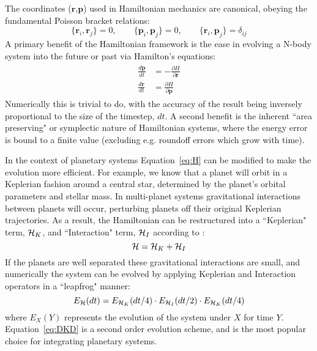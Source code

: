 The coordinates ($\textbf{r}$,$\textbf{p}$) used in Hamiltonian mechanics are canonical, obeying the fundamental Poisson bracket relations:
\begin{equation}
\{\textbf{r}_i, \textbf{r}_j\} = 0, \qquad
\{\textbf{p}_i, \textbf{p}_j\} = 0, \qquad
\{\textbf{r}_i, \textbf{p}_j\} = \delta_{ij}
\end{equation}
A primary benefit of the Hamiltonian framework is the ease in evolving a N-body system into the future or past via Hamilton's equations:
\begin{align}
\begin{split}
\frac{d\textbf{p}}{dt} &= -\frac{\partial H}{\partial \textbf{r}} \\
\frac{d\textbf{r}}{dt} &= \frac{\partial H}{\partial \textbf{p}} 
\label{eq:Heq}
\end{split}
\end{align}
Numerically this is trivial to do, with the accuracy of the result being inversely proportional to the size of the timestep, $dt$.
A second benefit is the inherent ``area preserving" or symplectic nature of Hamiltonian systems, where the energy error is bound to a finite value (excluding e.g. roundoff errors which grow with time).

In the context of planetary systems Equation~\ref{eq:H} can be modified to make the evolution more efficient.
For example, we know that a planet will orbit in a Keplerian fashion around a central star, determined by the planet's orbital parameters and stellar mass. 
In multi-planet systems gravitational interactions between planets will occur, perturbing planets off their original Keplerian trajectories.
As a result, the Hamiltonian can be restructured into a ``Keplerian" term, $\mathcal{H}_K$, and ``Interaction" term, $\mathcal{H}_I$ according to \citep{Wisdom1991}:
\begin{equation*}
\mathcal{H} = \mathcal{H}_K + \mathcal{H}_I
\end{equation*}
If the planets are well separated these gravitational interactions are small, and numerically the system can be evolved by applying Keplerian and Interaction operators in a ``leapfrog" manner:
\begin{equation}
E_{\mathcal{H}}(dt) = E_{\mathcal{H}_K}(dt/4) \cdot E_{\mathcal{H}_I}(dt/2) \cdot E_{\mathcal{H}_K}(dt/4)
\label{eq:DKD}
\end{equation}
where $E_{X}(Y)$ represents the evolution of the system under $X$ for time $Y$.
Equation~\ref{eq:DKD} is a second order evolution scheme, and is the most popular choice for integrating planetary systems.

